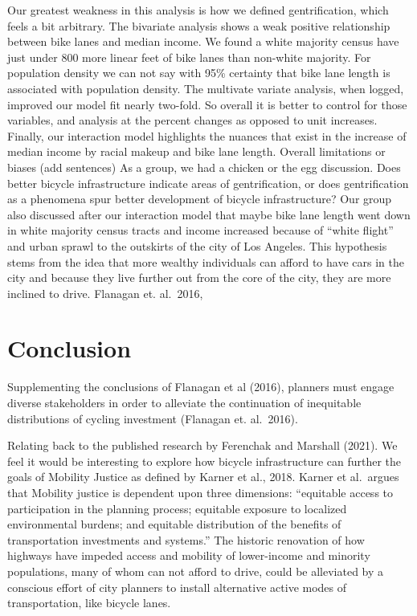 \documentclass[
]{article}
\begin{document}
Our greatest weakness in this analysis is how we defined gentrification,
which feels a bit arbitrary. The bivariate analysis shows a weak
positive relationship between bike lanes and median income. We found a
white majority census have just under 800 more linear feet of bike lanes
than non-white majority. For population density we can not say with 95\%
certainty that bike lane length is associated with population density.
The multivate variate analysis, when logged, improved our model fit
nearly two-fold. So overall it is better to control for those variables,
and analysis at the percent changes as opposed to unit increases.
Finally, our interaction model highlights the nuances that exist in the
increase of median income by racial makeup and bike lane length. Overall
limitations or biases (add sentences) As a group, we had a chicken or
the egg discussion. Does better bicycle infrastructure indicate areas of
gentrification, or does gentrification as a phenomena spur better
development of bicycle infrastructure? Our group also discussed after
our interaction model that maybe bike lane length went down in white
majority census tracts and income increased because of ``white flight''
and urban sprawl to the outskirts of the city of Los Angeles. This
hypothesis stems from the idea that more wealthy individuals can afford
to have cars in the city and because they live further out from the core
of the city, they are more inclined to drive. Flanagan et. al.~2016,

\hypertarget{conclusion}{%
\section{Conclusion}\label{conclusion}}

Supplementing the conclusions of Flanagan et al (2016), planners must
engage diverse stakeholders in order to alleviate the continuation of
inequitable distributions of cycling investment (Flanagan et. al.~2016).

Relating back to the published research by Ferenchak and Marshall
(2021). We feel it would be interesting to explore how bicycle
infrastructure can further the goals of Mobility Justice as defined by
Karner et al., 2018. Karner et al.~argues that Mobility justice is
dependent upon three dimensions: ``equitable access to participation in
the planning process; equitable exposure to localized environmental
burdens; and equitable distribution of the benefits of transportation
investments and systems.'' The historic renovation of how highways have
impeded access and mobility of lower-income and minority populations,
many of whom can not afford to drive, could be alleviated by a conscious
effort of city planners to install alternative active modes of
transportation, like bicycle lanes.
\end{document}
